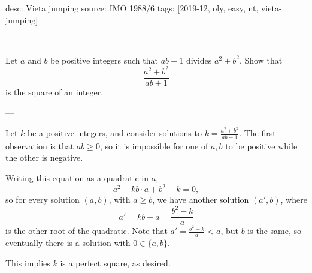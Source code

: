 desc: Vieta jumping
source: IMO 1988/6
tags: [2019-12, oly, easy, nt, vieta-jumping]

---

Let $a$ and $b$ be positive integers such that $ab+1$ divides $a^2+b^2$. Show that \[\frac{a^2+b^2}{ab+1}\]
is the square of an integer.

---

Let $k$ be a positive integers, and consider solutions to $k=\frac{a^2+b^2}{ab+1}$. The first observation is that $ab\ge0$, so it is impossible for one of $a,b$ to be positive while the other is negative.

Writing this equation as a quadratic in $a$, \[a^2-kb\cdot a+b^2-k=0,\]
so for every solution $(a,b)$, with $a\ge b$, we have another solution $(a',b)$, where \[a'=kb-a=\frac{b^2-k}a\]
is the other root of the quadratic. Note that $a'=\frac{b^2-k}a<a$, but $b$ is the same, so eventually there is a solution with $0\in\{a,b\}$.

This implies $k$ is a perfect square, as desired.
